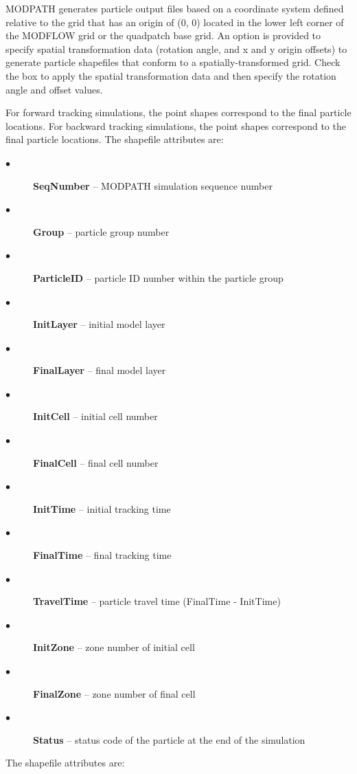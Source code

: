 \documentclass[11pt,twoside,twocolumn]{usgsreport}
\begin{document}
MODPATH generates particle output files based on a coordinate system defined relative to the grid that has an origin of (0, 0) located in the lower left corner of the MODFLOW grid or the quadpatch base grid. An option is provided to specify spatial transformation data (rotation angle, and x and y origin offsets) to generate particle shapefiles that conform to a spatially-transformed grid. Check the box to apply the spatial transformation data and then specify the rotation angle and offset values. 

For forward tracking simulations, the point shapes correspond to the final particle locations. For backward tracking simulations, the point shapes correspond to the final particle locations. The shapefile attributes are:

\begin{description}
  \item[$\bullet$ ] \textbf{SeqNumber} -- MODPATH simulation sequence number
  \item[$\bullet$ ] \textbf{Group} -- particle group number
  \item[$\bullet$ ] \textbf{ParticleID} -- particle ID number within the particle group
  \item[$\bullet$ ] \textbf{InitLayer} -- initial model layer
  \item[$\bullet$ ] \textbf{FinalLayer} -- final model layer
  \item[$\bullet$ ] \textbf{InitCell} -- initial cell number
  \item[$\bullet$ ] \textbf{FinalCell} -- final cell number
  \item[$\bullet$ ] \textbf{InitTime} -- initial tracking time
  \item[$\bullet$ ] \textbf{FinalTime} -- final tracking time
  \item[$\bullet$ ] \textbf{TravelTime} -- particle travel time (FinalTime - InitTime)
  \item[$\bullet$ ] \textbf{InitZone} -- zone number of initial cell
  \item[$\bullet$ ] \textbf{FinalZone} -- zone number of final cell
  \item[$\bullet$ ] \textbf{Status} -- status code of the particle at the end of the simulation
\end{description}

The shapefile attributes are:
\end{document}
